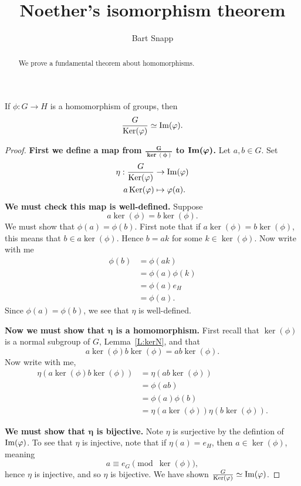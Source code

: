\documentclass{ximera}
\author{Bart Snapp}
\title{Noether's isomorphism theorem}
\begin{document}
\begin{abstract}
  We prove a fundamental theorem about homomorphisms.
\end{abstract}
\maketitle

\begin{theorem}\label{T:NI}
  If $\phi:G\to H$ is a homomorphism of groups, then
  \[
  \frac{G}{\mathop{\mathrm{Ker}}\nolimits(\varphi)} \simeq \operatorname{Im}(\varphi).
  \]
  \begin{proof}
    \textbf{First we define a map from $\boldsymbol{\frac{G}{\ker(\phi)}}$ to $\boldsymbol{\operatorname{Im}(\varphi)}$.}
    Let $a,b\in G$. Set
    \begin{align*}
      \eta: \frac{G}{\mathop{\mathrm{Ker}}\nolimits(\varphi)} &\to \operatorname{Im}(\varphi)\\
      a\mathop{\mathrm{Ker}}\nolimits(\varphi) &\mapsto \varphi(a).
    \end{align*}
    \textbf{We must check this map is
      well-defined.} Suppose
    \[
    a \ker(\phi) = b\ker(\phi).
    \]
    We must show that $\phi(a) = \phi(b)$. First note that if $a
    \ker(\phi) = b\ker(\phi)$, this means that $b\in
    a\ker(\phi)$. Hence $b = ak$ for some $k\in\ker(\phi)$. Now write
    with me
    \begin{align*}
      \phi(b) &=\phi(ak)\\
      &=\phi(a)\phi(k)\\
      &=\phi(a) e_H\\
      &=\phi(a).
    \end{align*}
    Since $\phi(a) = \phi(b)$, we see that $\eta$ is well-defined.


    
    \textbf{Now we must show that $\boldsymbol\eta$ is a
      homomorphism.} First recall that $\ker(\phi)$ is a normal
    subgroup of $G$, Lemma~\ref{L:kerN}, and that
    \[
    a\ker(\phi) b\ker(\phi)  =  ab\ker(\phi).
    \]
    Now write with me, 
    \begin{align*}
    \eta(a\ker(\phi) b\ker(\phi)) &= \eta(ab\ker(\phi))\\
    &= \phi(ab)\\
    &= \phi(a)\phi(b)\\
    &= \eta(a\ker(\phi)) \eta(b\ker(\phi)).
    \end{align*}



    \textbf{We must show that $\boldsymbol\eta$ is bijective.} Note
    $\eta$ is surjective by the defintion of $\operatorname{Im}(\varphi)$.  To see that
    $\eta$ is injective, note that if $\eta(a) = e_H$, then $a\in
    \ker(\phi)$, meaning
    \[
    a\equiv e_G \pmod{\ker(\phi)},
    \]
    hence $\eta$ is injective, and so $\eta$ is bijective. We have
    shown $\frac{G}{\mathop{\mathrm{Ker}}\nolimits(\varphi)} \simeq \operatorname{Im}(\varphi)$.
  \end{proof}
\end{theorem}
\end{document}
